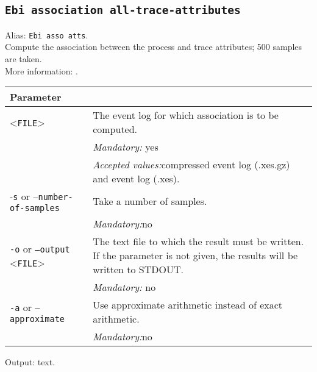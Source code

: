 {\subsection{\texttt{Ebi association all-trace-attributes}}
Alias: \texttt{Ebi asso atts}.\\
Compute the association between the process and trace attributes; 500 samples are taken.\\
More information: \cite{DBLP:journals/tkde/LeemansMPH23}.\\
\begin{tabularx}{\linewidth}{lX}
\toprule
Parameter \\\midrule
<\texttt{FILE}>&The event log for which association is to be computed.\\
&\textit{Mandatory:} \quad yes\\
&\textit{Accepted values:}\quad compressed event log (.xes.gz) and event log (.xes).\\
-\texttt{s} or --\texttt{number-of-samples}
&Take a number of samples.\\
&\textit{Mandatory:}\quad no\\
\texttt{-o} or \texttt{--output} <\texttt{FILE}> &
The text file to which the result must be written. If the parameter is not given, the results will be written to STDOUT.\\
&\textit{Mandatory:} \quad no\\
\texttt{-a} or \texttt{--approximate} & Use approximate arithmetic instead of exact arithmetic.\\
&\textit{Mandatory:}\quad no\\
\bottomrule
\end{tabularx}
Output: text.
}
